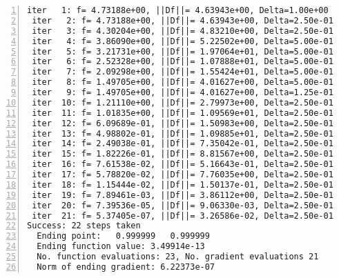 \documentclass[12pt]{article}
\begin{document}
\begin{enumerate}
\begin{lstlisting}[language={[ANSI]C}, numbers=left, numberstyle=\tiny, frame=shadowbox, basicstyle=\ttfamily\small, showspaces=false, breaklines=true, showstringspaces=false, showtabs=false]
 iter   1: f= 4.73188e+00, ||Df||= 4.63943e+00, Delta=1.00e+00
 iter   2: f= 4.73188e+00, ||Df||= 4.63943e+00, Delta=2.50e-01
 iter   3: f= 4.30204e+00, ||Df||= 4.83210e+00, Delta=2.50e-01
 iter   4: f= 3.86090e+00, ||Df||= 5.22502e+00, Delta=5.00e-01
 iter   5: f= 3.21731e+00, ||Df||= 1.97064e+01, Delta=5.00e-01
 iter   6: f= 2.52328e+00, ||Df||= 1.07888e+01, Delta=5.00e-01
 iter   7: f= 2.09298e+00, ||Df||= 1.55424e+01, Delta=5.00e-01
 iter   8: f= 1.49705e+00, ||Df||= 4.01627e+00, Delta=5.00e-01
 iter   9: f= 1.49705e+00, ||Df||= 4.01627e+00, Delta=1.25e-01
 iter  10: f= 1.21110e+00, ||Df||= 2.79973e+00, Delta=2.50e-01
 iter  11: f= 1.01835e+00, ||Df||= 1.09569e+01, Delta=2.50e-01
 iter  12: f= 6.09689e-01, ||Df||= 1.50983e+00, Delta=2.50e-01
 iter  13: f= 4.98802e-01, ||Df||= 1.09885e+01, Delta=2.50e-01
 iter  14: f= 2.49038e-01, ||Df||= 7.35042e-01, Delta=2.50e-01
 iter  15: f= 1.82226e-01, ||Df||= 8.81567e+00, Delta=2.50e-01
 iter  16: f= 7.61538e-02, ||Df||= 5.16643e-01, Delta=2.50e-01
 iter  17: f= 5.78820e-02, ||Df||= 7.76035e+00, Delta=2.50e-01
 iter  18: f= 1.15444e-02, ||Df||= 1.50137e-01, Delta=2.50e-01
 iter  19: f= 7.89461e-03, ||Df||= 3.86112e+00, Delta=2.50e-01
 iter  20: f= 7.39536e-05, ||Df||= 9.06330e-03, Delta=2.50e-01
 iter  21: f= 5.37405e-07, ||Df||= 3.26586e-02, Delta=2.50e-01
Success: 22 steps taken
  Ending point:   0.999999   0.999999
  Ending function value: 3.49914e-13
  No. function evaluations: 23, No. gradient evaluations 21
  Norm of ending gradient: 6.22373e-07
\end{lstlisting}

\end{enumerate}
\end{document}
